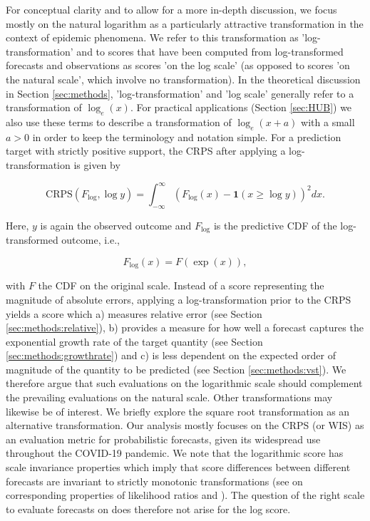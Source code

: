 \documentclass{article}
\begin{document}
For conceptual clarity and to allow for a more in-depth discussion, we focus mostly on the natural logarithm as a particularly attractive transformation in the context of epidemic phenomena. We refer to this transformation as 'log-transformation' and to scores that have been computed from log-transformed forecasts and observations as scores 'on the log scale' (as opposed to scores 'on the natural scale', which involve no transformation). In the theoretical discussion in Section \ref{sec:methods}, 'log-transformation' and 'log scale' generally refer to a transformation of $\log_{e}(x)$. For practical applications (Section \ref{sec:HUB}) we also use these terms to describe a transformation of $\log_{e}(x + a)$ with a small $a > 0$ in order to keep the terminology and notation simple. For a prediction target with strictly positive support, the CRPS after applying a log-transformation is given by
%
\begin{linenomath*}
\begin{equation}
    \text{CRPS}(F_{\log}, \log y) = \int_{-\infty}^\infty \left( F_{\log}(x) - \boldsymbol{1}(x \geq \log y) \right)^2 dx.
\end{equation}    
\end{linenomath*}
%
Here, $y$ is again the observed outcome and $F_{\log}$ is the predictive CDF of the log-transformed outcome, i.e.,
\begin{linenomath*}
\begin{equation}
F_{\log}(x) = F(\exp(x)),
\end{equation}    
\end{linenomath*}
with $F$ the CDF on the original scale. Instead of a score representing the magnitude of absolute errors, applying a log-transformation prior to the CRPS yields a score which a) measures relative error (see Section \ref{sec:methods:relative}), b) provides a measure for how well a forecast captures the exponential growth rate of the target quantity (see Section \ref{sec:methods:growthrate}) and c) is less dependent on the expected order of magnitude of the quantity to be predicted (see Section \ref{sec:methods:vst}). 
We therefore argue that such evaluations on the logarithmic scale should complement the prevailing evaluations on the natural scale. 
Other transformations may likewise be of interest. We briefly explore the square root transformation as an alternative transformation. 
Our analysis mostly focuses on the CRPS (or WIS) as an evaluation metric for probabilistic forecasts, given its widespread use throughout the COVID-19 pandemic. We note that the logarithmic score has scale invariance properties which imply that score differences between different forecasts are invariant to strictly monotonic transformations (see \citealt{Lehmann1950} on corresponding properties of likelihood ratios and \citealt{diksLikelihoodbasedScoringRules2011}). The question of the right scale to evaluate forecasts on does therefore not arise for the log score. 
\end{document}
